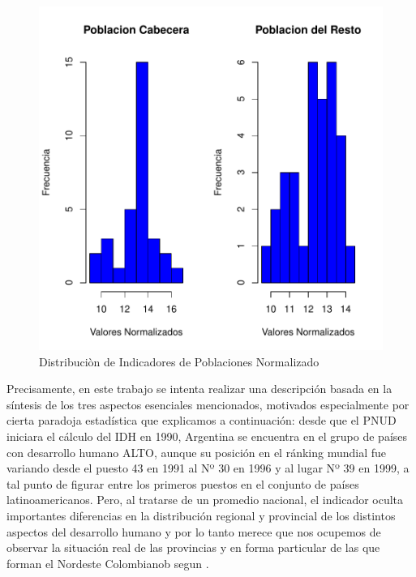 \begin{figure}[h]
\includegraphics{univariada-hist1}
\caption{Distribuciòn de Indicadores de Poblaciones Normalizado}
\label{hist1}
\end{figure}

Precisamente, en este trabajo se intenta realizar una descripción basada en la síntesis de los tres aspectos esenciales mencionados, motivados especialmente por cierta paradoja estadística que explicamos a continuación: desde que el PNUD iniciara el cálculo del IDH en 1990, Argentina se encuentra en el grupo de países con desarrollo humano ALTO, aunque su posición en el ránking mundial fue variando desde el puesto 43 en 1991 al Nº 30 en 1996 y al lugar Nº 39 en 1999, a tal punto de figurar entre los primeros puestos en el conjunto de países latinoamericanos. Pero, al tratarse de un promedio nacional, el indicador oculta importantes diferencias en la distribución regional y provincial de los distintos aspectos del desarrollo humano y por lo tanto merece que nos ocupemos de observar la situación real de las provincias y en forma particular de las que forman el Nordeste Colombianob segun \cite{konrad-adenauer-stiftung_indice_2003} . 

\endinput
